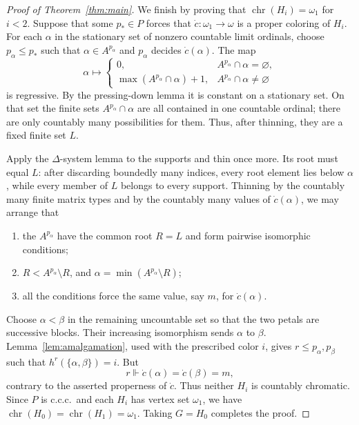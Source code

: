 \documentclass[10pt,a4paper]{amsart}
\numberwithin{equation}{section}
\theoremstyle{definition}
\theoremstyle{remark}
\newcommand{\chr}{\operatorname{chr}}
\begin{document}
\begin{proof}[Proof of Theorem~\ref{thm:main}]
We finish by proving that $\chr(H_i)=\omega_1$ for $i<2$.  Suppose
that some $p_*\in P$ forces that
$\dot c:\omega_1\to\omega$ is a proper coloring of $H_i$.  For each
$\alpha$ in the stationary set of nonzero countable limit ordinals,
choose $p_\alpha\leq p_*$ such that $\alpha\in A^{p_\alpha}$ and
$p_\alpha$ decides $\dot c(\alpha)$.  The map
\begin{displaymath}
 \alpha\longmapsto
 \begin{cases}
 0,&A^{p_\alpha}\cap\alpha=\varnothing,\\
 \max(A^{p_\alpha}\cap\alpha)+1,&A^{p_\alpha}\cap\alpha\ne\varnothing
 \end{cases}
\end{displaymath}
is regressive.  By the pressing-down lemma it is constant on a
stationary set.  On that set the finite sets
$A^{p_\alpha}\cap\alpha$ are all contained in one countable ordinal;
there are only countably many possibilities for them.  Thus, after
thinning, they are a fixed finite set $L$.

Apply the $\Delta$-system lemma to the supports and thin once more.
Its root must equal $L$: after discarding boundedly many indices, every
root element lies below $\alpha$, while every member of $L$ belongs to
every support.  Thinning by the countably many finite matrix types and
by the countably many values of $\dot c(\alpha)$, we may arrange that
\begin{enumerate}
\item the $A^{p_\alpha}$ have the common root $R=L$ and form pairwise
isomorphic conditions;
\item $R<A^{p_\alpha}\setminus R$, and
$\alpha=\min(A^{p_\alpha}\setminus R)$;
\item all the conditions force the same value, say $m$, for
$\dot c(\alpha)$.
\end{enumerate}
Choose $\alpha<\beta$ in the remaining uncountable set so that the two
petals are successive blocks.  Their increasing isomorphism sends
$\alpha$ to $\beta$.  Lemma~\ref{lem:amalgamation}, used with the
prescribed color $i$, gives $r\leq p_\alpha,p_\beta$ such that
$h^r(\{\alpha,\beta\})=i$.  But
\begin{displaymath}
 r\Vdash \dot c(\alpha)=\dot c(\beta)=m,
\end{displaymath}
contrary to the asserted properness of $\dot c$.  Thus neither $H_i$
is countably chromatic.  Since $P$ is c.c.c.\ and each $H_i$ has vertex
set $\omega_1$, we have
$\chr(H_0)=\chr(H_1)=\omega_1$.  Taking $G=H_0$ completes the proof.
\end{proof}
\end{document}
